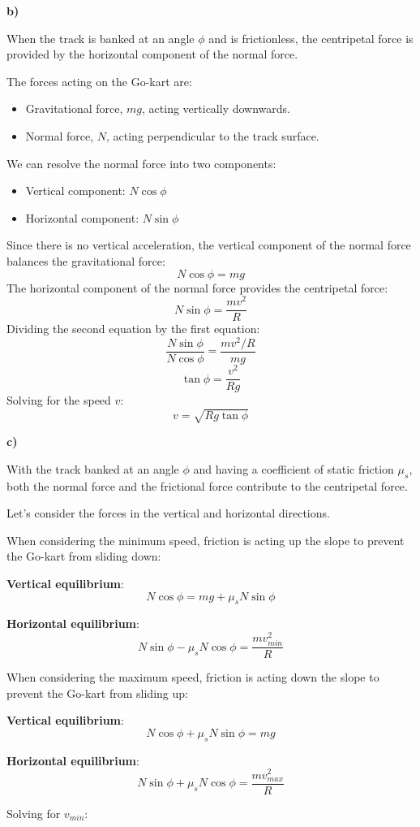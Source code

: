 \documentclass{article}
\begin{document}
\textbf{b)}

When the track is banked at an angle $\phi$ and is frictionless, the centripetal force is provided by the horizontal component of the normal force.

The forces acting on the Go-kart are:
\begin{itemize}
    \item Gravitational force, $mg$, acting vertically downwards.
    \item Normal force, $N$, acting perpendicular to the track surface.
\end{itemize}
We can resolve the normal force into two components:
\begin{itemize}
    \item Vertical component: $N\cos\phi$
    \item Horizontal component: $N\sin\phi$
\end{itemize}
Since there is no vertical acceleration, the vertical component of the normal force balances the gravitational force:
$$N\cos\phi = mg$$
The horizontal component of the normal force provides the centripetal force:
$$N\sin\phi = \frac{mv^2}{R}$$
Dividing the second equation by the first equation:
$$\frac{N\sin\phi}{N\cos\phi} = \frac{mv^2/R}{mg}$$
$$\tan\phi = \frac{v^2}{Rg}$$
Solving for the speed $v$:
$$v = \sqrt{Rg\tan\phi}$$

\textbf{c)}

With the track banked at an angle $\phi$ and having a coefficient of static friction $\mu_s$, both the normal force and the frictional force contribute to the centripetal force.

Let's consider the forces in the vertical and horizontal directions.

When considering the minimum speed, friction is acting up the slope to prevent the Go-kart from sliding down:

\textbf{Vertical equilibrium}:
$$N\cos\phi = mg + \mu_s N\sin\phi$$

\textbf{Horizontal equilibrium}:
$$N\sin\phi - \mu_s N\cos\phi = \frac{mv_{min}^2}{R}$$

When considering the maximum speed, friction is acting down the slope to prevent the Go-kart from sliding up:

\textbf{Vertical equilibrium}:
$$N\cos\phi + \mu_s N\sin\phi = mg$$

\textbf{Horizontal equilibrium}:
$$N\sin\phi + \mu_s N\cos\phi = \frac{mv_{max}^2}{R}$$

Solving for $v_{min}$:
\end{document}
